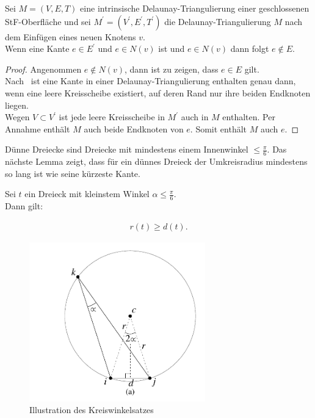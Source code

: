 \begin{lemma}
\label{le:adejazent}
Sei $M = (V,E,T)$ eine intrinsische Delaunay-Triangulierung  einer geschlossenen  StF-Oberfläche und sei $M^\prime = (V^\prime,E^\prime,T^\prime)$ die Delaunay-Triangulierung  $M$ nach dem Einfügen eines neuen Knotens $v$.\\
 

Wenn eine Kante $e \in E^\prime$ und $e \in N(v)$ ist und $e \in  N(v)$
dann folgt $e \not \in   E $.\\



\end{lemma}


\begin{proof}

 
Angenommen $e \not \in  N(v)$, dann ist zu zeigen, dass $e\in E $ gilt.\\

Nach~\cite[Definition 3]{Bobenko:2007:LaplaceBeltrami} ist eine Kante in einer Delaunay-Triangulierung  enthalten genau dann, wenn eine leere Kreisscheibe existiert, auf deren Rand nur ihre beiden Endknoten liegen.\\ 

    Wegen $V \subset V^\prime$  ist jede leere Kreisscheibe in $M^\prime$  auch in  $M$ enthalten. Per Annahme enthält $M$ auch beide Endknoten von $e$. Somit enthält $M$ auch $e$.     
\end{proof}


Dünne Dreiecke sind Dreiecke mit mindestens einem Innenwinkel $\leq \frac{\pi}{6}$.  
Das nächste Lemma zeigt, dass für ein dünnes Dreieck der Umkreisradius mindestens so lang ist wie seine kürzeste Kante.


\begin{lemma}
\label{le:dünnes_dreieck}
Sei $t$ ein Dreieck mit kleinstem Winkel $\alpha \leq \frac{\pi}{6}$.\\
Dann gilt: 
 
 \begin{align*}
     r(t) \geq d(t).
 \end{align*} 
 \end{lemma}

\begin{figure}[h]
    \centering
    \includegraphics[width=3in]{images/Kreiswinkelsatz.png}
    \caption{Illustration des Kreiswinkelsatzes~\cite{shewchuk:1997:delaunay}}
    \label{fig:kreiswinkelsatz}
\end{figure}


